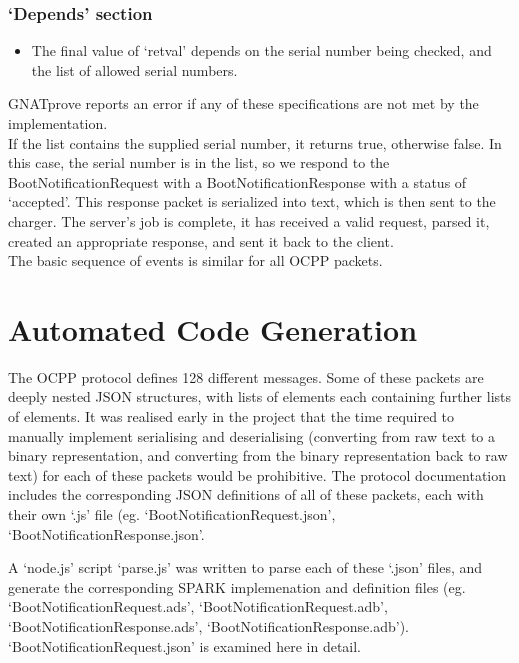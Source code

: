 \documentclass[12pt,openany,a4paper]{book}
\begin{document}
\subsubsection{`Depends' section}
\begin{itemize}
\item The final value of `retval' depends on the serial number being checked, and the list of allowed serial numbers. 
\end{itemize}
GNATprove reports an error if any of these specifications are not met by the implementation.\\

If the list contains the supplied serial number, it returns true, otherwise false. In this case, the serial number is in the list, so we respond to the BootNotificationRequest with a BootNotificationResponse with a status of `accepted'. This response packet is serialized into text, which is then sent to the charger. The server's job is complete, it has received a valid request, parsed it, created an appropriate response, and sent it back to the client.\\

The basic sequence of events is similar for all OCPP packets.

\section{Automated Code Generation}

The OCPP protocol defines 128 different messages. Some of these packets are deeply nested JSON structures, with lists of elements each containing further lists of elements. It was realised early in the project that the time required to manually implement serialising and deserialising (converting from raw text to a binary representation, and converting from the binary representation back to raw text) for each of these packets would be prohibitive. The protocol documentation includes the corresponding JSON definitions of all of these packets, each with their own `.js' file (eg. `BootNotificationRequest.json', `BootNotificationResponse.json'.

A `node.js' script `parse.js' was written to parse each of these `.json' files, and generate the corresponding SPARK implemenation and definition files (eg. `BootNotificationRequest.ads', `BootNotificationRequest.adb', `BootNotificationResponse.ads', `BootNotificationResponse.adb'). `BootNotificationRequest.json' is examined here in detail.
\end{document}
